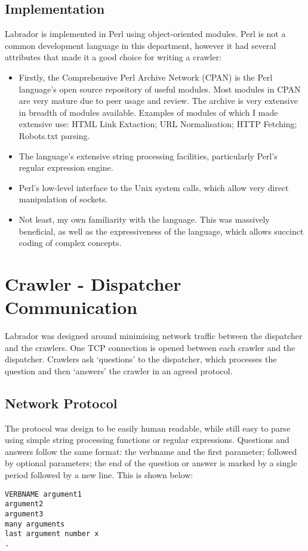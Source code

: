 \subsection{Implementation}
Labrador is implemented in Perl using object-oriented modules. Perl is not a common development language in this department, however it had several attributes that made it a good choice for writing a crawler:
\begin{itemize}
\item{Firstly, the Comprehensive Perl Archive Network\cite{site1} (CPAN) is the Perl language's open source repository of useful modules. Most modules in CPAN are very mature due to peer usage and review. The archive is very extensive in breadth of modules available. Examples of modules of which I made extensive use: HTML Link Extaction; URL Normalisation; HTTP Fetching; Robots.txt parsing.}
\item{The language's extensive string processing facilities, particularly Perl's regular expression engine.}
\item{Perl's low-level interface to the Unix system calls, which allow very direct manipulation of sockets.}
\item{Not least, my own familiarity with the language. This was massively beneficial, as well as the expressiveness of the language, which allows succinct coding of complex concepts.}
\end{itemize}

\section{Crawler - Dispatcher Communication}
Labrador was designed around minimising network traffic between the dispatcher and the crawlers. One TCP connection is opened between each crawler and the dispatcher. Crawlers ask `questions' to the dispatcher, which processes the question and then `answers' the crawler in an agreed protocol.

\subsection{Network Protocol}
The protocol was design to be easily human readable, while still easy to parse using simple string processing functions or regular expressions. Questions and answers follow the same format: the verbname and the first parameter; followed by optional parameters; the end of the question or answer is marked by a single period followed by a new line. This is shown below:
\renewcommand{\baselinestretch}{1.0}
\begin{verbatim}
VERBNAME argument1
argument2 
argument3
many arguments
last argument number x
.
\end{verbatim}
\renewcommand{\baselinestretch}{1.5}

